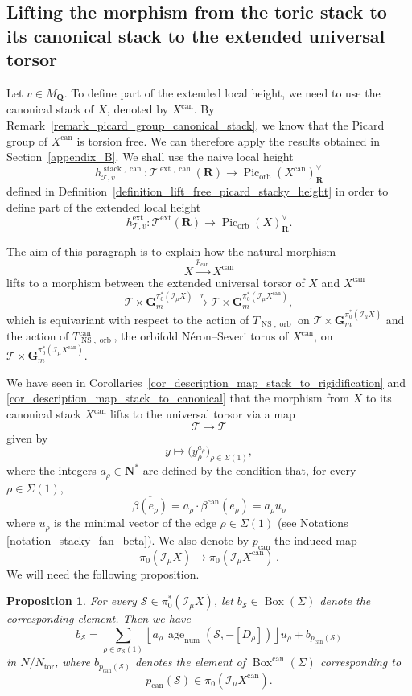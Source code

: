 \documentclass{proc-l}
\newcommand{\R}{\mathbf{R}}
\newcommand{\N}{\mathbf{N}}
\newcommand{\Q}{\mathbf{Q}}
\newcommand{\I}{\mathcal{I}}
\newcommand{\G}{\mathbf{G}}
\DeclareMathOperator{\Pic}{Pic}
\DeclareMathOperator{\can}{can}
\DeclareMathOperator{\stack}{stack}
\DeclareMathOperator{\num}{num}
\DeclareMathOperator{\age}{age}
\DeclareMathOperator{\NS}{NS}
\DeclareMathOperator{\orb}{orb}
\DeclareMathOperator{\tor}{tor}
\DeclareMathOperator{\Boxe}{Box}
\DeclareMathOperator{\ext}{ext}
\newcommand{\stackS}{\mathcal{S}}
\newcommand{\stackT}{\mathcal{T}}
\newcommand{\sheafI}{\mathcal{I}}
\newcommand{\sector}{\pi_0(\sheafI_{\mu} X)}
\newcommand{\twistsector}{\pi_0^*(\sheafI_{\mu} X)}
\newtheorem{prop}[theorem]{Proposition}
\theoremstyle{definition}
\theoremstyle{remark}
\numberwithin{equation}{section}
\begin{document}
\subsection{Lifting the morphism from the toric stack to its canonical stack to the extended universal torsor}





Let $v \in M_{\Q}$. To define part of the extended local height, we need to use the canonical stack
of $X$, denoted by $X^{\can}$. By Remark~\ref{remark_picard_group_canonical_stack}, we
know that the Picard group of $X^{\can}$ is torsion free. We can therefore apply the results obtained in Section~\ref{appendix_B}. We shall use the naive local
height
\[
h^{\stack,\can}_{\stackT,v} : \stackT^{\ext,\can}(\R) \longrightarrow \Pic_{\orb}(X^{\can})^{\vee}_{\R}
\]
defined in Definition~\ref{definition_lift_free_picard_stacky_height} in order to define part of
the extended local height
\[
h_{\stackT,v}^{\ext} : \stackT^{\ext}(\R) \longrightarrow \Pic_{\orb}(X)^{\vee}_{\R}.
\]

The aim of this paragraph is to explain how the natural morphism
\[
X \xrightarrow{p_{\can}} X^{\can}
\]
lifts to a morphism between the extended universal torsor of $X$ and $X^{\can}$
\[
\stackT \times \G_m^{\twistsector}
\xrightarrow{r}
\stackT \times \G_m^{\pi_0^*(\I_{\mu} X^{\can})},
\]
which is equivariant with respect to the action of $T_{\NS,\orb}$ on
$\stackT \times \G_m^{\twistsector}$ and the action of $T^{\can}_{\NS,\orb}$, the orbifold Néron--Severi
torus of $X^{\can}$, on $\stackT \times \G_m^{\pi_0^*(\I_{\mu} X^{\can})}$.


We have seen in Corollaries~\ref{cor_description_map_stack_to_rigidification} and
\ref{cor_description_map_stack_to_canonical} that the morphism
from $X$ to its canonical stack $X^{\can}$ lifts to the universal torsor via a map
\[
\stackT \longrightarrow \stackT
\]
given by
\[
y \longmapsto \bigl( y_{\rho}^{a_{\rho}} \bigr)_{\rho \in \Sigma(1)},
\]
where the integers $a_{\rho} \in \N^{*}$ are defined by the condition that, for every
$\rho \in \Sigma(1)$,
\[
\overline{\beta(e_{\rho})} = a_{\rho} \cdot \beta^{\can}(e_{\rho}) = a_{\rho} u_{\rho}
\]where $u_{\rho}$ is the minimal vector of the edge $\rho \in \Sigma(1)$ (see Notations \ref{notation_stacky_fan_beta}). We also denote by $p_{\can}$ the induced map
$$
\sector \longrightarrow \pi_0(\I_{\mu} X^{\can}) \, .
$$We will need the following proposition.

\begin{prop}\label{prop_computation_box_element_canonicalisation}
For every $\stackS \in \twistsector$, let $b_{\stackS} \in \Boxe(\Sigma)$ denote the corresponding element. Then we have
$$
\overline{b}_{\stackS}
=
\sum_{\rho \in \sigma_\stackS(1)}
\left\lfloor
a_{\rho}\,\age_{\num}(\stackS,-[D_{\rho}])
\right\rfloor
u_{\rho}
+
b_{p_{\can}(\stackS)}
$$
in $N / N_{\tor}$, where $b_{p_{\can}(\stackS)}$ denotes the element of $\Boxe^{\can}(\Sigma)$ corresponding to $$p_{\can}(\stackS) \in \pi_0(\I_{\mu} X^{\can}).$$
\end{prop}
\end{document}
